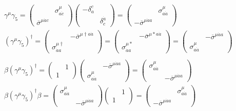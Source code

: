 \documentclass[twoside]{amsart}
\begin{document}
\[
\begin{gathered}
  \begin{aligned}
    \gamma^{\mu} \gamma_5 = \left( \begin{matrix} & \sigma^{\mu}_{a\dot{c}} \\ \overline{ \sigma}^{\mu \dot{a} c} & \end{matrix} \right) \left( \begin{matrix} - \delta_a^c & \\  & \delta^{\dot{a}}_{\dot{c}} \end{matrix} \right) = \left( \begin{matrix} & \sigma^{\mu}_{a\dot{a}} \\ - \overline{\sigma}^{\mu \dot{a} a} & \end{matrix} \right) \\ 
 (   \gamma^{\mu} \gamma_5 )^{\dag} = \left( \begin{matrix} & - \overline{\sigma}^{\mu \dag a\dot{a}} \\ \sigma^{\mu \dag}_{\dot{a} a} & \end{matrix} \right)  = \left( \begin{matrix} & - \overline{\sigma}^{\mu * a\dot{a}} \\ \sigma^{\mu *}_{\dot{a} a} & \end{matrix} \right) = \left( \begin{matrix} & - \overline{\sigma}^{\mu \dot{a}a} \\ \sigma^{\mu }_{a\dot{a} } & \end{matrix} \right) 
\end{aligned}
 \quad \quad \, \\ \begin{aligned}
   \beta( \gamma^{\mu} \gamma_5 )^{\dag} = \left( \begin{matrix} & 1 \\ 1 & \end{matrix} \right) \left( \begin{matrix} & - \overline{\sigma}^{\mu \dot{a} a} \\ \sigma^{\mu}_{ a \dot{a}} & \end{matrix} \right) = \left( \begin{matrix} \sigma^{\mu}_{a\dot{a}} & \\ & - \overline{\sigma}^{\mu \dot{a} a} \end{matrix} \right) \\ 
   \beta( \gamma^{\mu} \gamma_5 )^{\dag}\beta =  \left( \begin{matrix} \sigma^{\mu}_{a\dot{a}} & \\ & - \overline{\sigma}^{\mu \dot{a} a}  \end{matrix} \right) \left( \begin{matrix} & 1 \\ 1 & \end{matrix} \right)= \left( \begin{matrix} & \sigma^{\mu}_{a\dot{a}} \\  - \overline{\sigma}^{\mu \dot{a} a} &  \end{matrix} \right) 
\end{aligned}
\end{gathered}
\]
\end{document}

